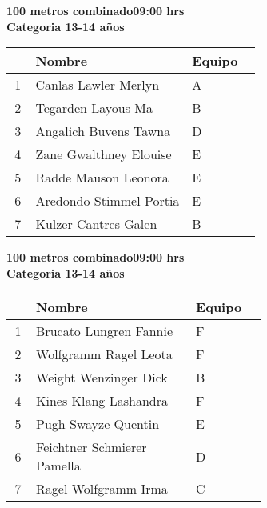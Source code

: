 \begin{minipage}{0.95\linewidth}\vspace{0.5cm} 
\begin{flushleft}
\textbf{
\hspace{-0.15cm}100 metros combinado\hspace{1.5cm}09:00 hrs \\Categoria 13-14 años}\vspace{-0.2cm} 
\end{flushleft}
\begin{tabular}{cp{0.63\linewidth}l}
\hline
& \textbf{Nombre} & \textbf{Equipo} \\ \hline
1 & Canlas Lawler Merlyn & A \\ 
2 & Tegarden Layous Ma & B \\ 
3 & Angalich Buvens Tawna & D \\ 
4 & Zane Gwalthney Elouise & E \\ 
5 & Radde Mauson Leonora & E \\ 
6 & Aredondo Stimmel Portia & E \\ 
7 & Kulzer Cantres Galen & B \\ 
\end{tabular}
\end{minipage}
\begin{minipage}{0.95\linewidth}\vspace{0.5cm} 
\begin{flushleft}
\textbf{
\hspace{-0.15cm}100 metros combinado\hspace{1.5cm}09:00 hrs \\Categoria 13-14 años}\vspace{-0.2cm} 
\end{flushleft}
\begin{tabular}{cp{0.63\linewidth}l}
\hline
& \textbf{Nombre} & \textbf{Equipo} \\ \hline
1 & Brucato Lungren Fannie & F \\ 
2 & Wolfgramm Ragel Leota & F \\ 
3 & Weight Wenzinger Dick & B \\ 
4 & Kines Klang Lashandra & F \\ 
5 & Pugh Swayze Quentin & E \\ 
6 & Feichtner Schmierer Pamella & D \\ 
7 & Ragel Wolfgramm Irma & C \\ 
\end{tabular}
\end{minipage}
